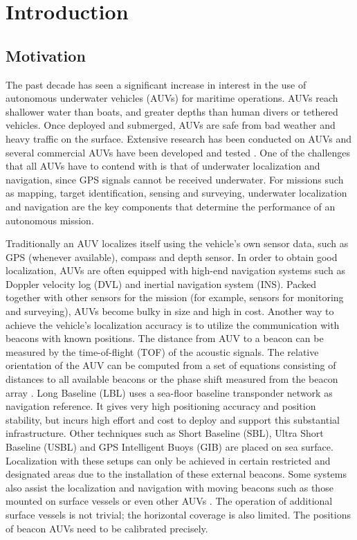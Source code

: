 
\chapter{Introduction}
\label{ch:introduction}

\section{Motivation}
\label{sec:Motivation}

The past decade has seen a significant increase in interest in the use of autonomous underwater vehicles (AUVs) for maritime operations. AUVs reach shallower water than boats, and greater depths than human divers or tethered vehicles. Once deployed and submerged, AUVs are safe from bad weather and heavy traffic on the surface. Extensive research has been conducted on AUVs and several commercial AUVs have been developed and tested \cite{Kojima1997,Hagen2006,Byron2007}. One of the challenges that all AUVs have to contend with is that of underwater localization and navigation, since GPS signals cannot be received underwater. For missions such as mapping, target identification, sensing and surveying, underwater localization and navigation are the key components that determine the performance of an autonomous mission. 

Traditionally an AUV localizes itself using the vehicle's own sensor data, such as GPS (whenever available), compass and depth sensor. In order to obtain good localization, AUVs are often equipped with high-end navigation systems such as Doppler velocity log (DVL) and inertial navigation system (INS). Packed together with other sensors for the mission (for example, sensors for monitoring and surveying), AUVs become bulky in size and high in cost. Another way to achieve the vehicle's localization accuracy is to utilize the communication with beacons with known positions. The distance from AUV to a beacon can be measured by the time-of-flight (TOF) of the acoustic signals. The relative orientation of the AUV can be computed from a set of equations consisting of distances to all available beacons \cite{Zhou} or the phase shift measured from the beacon array \cite{Marin2018}. Long Baseline (LBL) uses a sea-floor baseline transponder network as navigation reference. It gives very high positioning accuracy and position stability, but incurs high effort and cost to deploy and support this substantial infrastructure. Other techniques such as Short Baseline (SBL), Ultra Short Baseline (USBL) \cite{milne1983} and GPS Intelligent Buoys (GIB) \cite{Alcocer2006} are placed on sea surface. Localization with these setups can only be achieved in certain restricted and designated areas due to the installation of these external beacons. Some systems also assist the localization and navigation with moving beacons such as those mounted on surface vessels \cite{Webster2013,AlexPhillips2018,Giovanni2018} or even other AUVs \cite{Gao2010}. The operation of additional surface vessels is not trivial; the horizontal coverage is also limited. The positions of beacon AUVs need to be calibrated precisely. 

